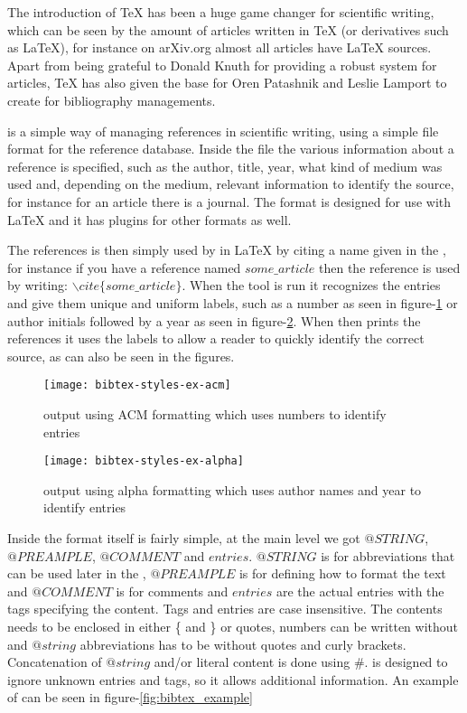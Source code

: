 The introduction of {\TeX} has been a huge game changer for scientific
writing, which can be seen by the amount of articles written in {\TeX}
(or derivatives such as {\LaTeX}), for instance on arXiv.org almost
all articles have {\LaTeX} sources.  Apart from being grateful to
Donald Knuth for providing a robust system for articles, {\TeX} has
also given the base for Oren Patashnik and Leslie Lamport to create
{\bibtex} for bibliography managements.

{\bibtex} is a simple way of managing references in scientific
writing, using a simple file format for the reference database.
Inside the file the various information about a reference is
specified, such as the author, title, year, what kind of medium was
used and, depending on the medium, relevant information to identify
the source, for instance for an article there is a journal.  The
{\bibtex} format is designed for use with {\LaTeX} and it has plugins
for other formats as well\cite{bibtex_resource}.

The references is then simply used by in {\LaTeX} by citing a name
given in the {\bibtex}, for instance if you have a reference named
$some\_article$ then the reference is used by writing:
${\backslash}cite\{some\_article\}$.  When the {\bibtex} tool is run
it recognizes the entries and give them unique and uniform labels,
such as a number as seen in figure-\ref{fig:bibtex_example_acm} or
author initials followed by a year as seen in
figure-\ref{fig:bibtex_example_alpha}.  When {\bibtex} then prints the
references it uses the labels to allow a reader to quickly identify
the correct source, as can also be seen in the figures.

\begin{figure}[ht]
  \centering
  \texttt{[image: bibtex-styles-ex-acm]}
  \caption{{\bibtex} output using ACM formatting which uses numbers to
    identify entries}
\label{fig:bibtex_example_acm}
\end{figure}

\begin{figure}[ht]
  \centering
  \texttt{[image: bibtex-styles-ex-alpha]}
  \caption{{\bibtex} output using alpha formatting which uses author
    names and year to identify entries}
\label{fig:bibtex_example_alpha}
\end{figure}

Inside {\bibtex} the format itself is fairly simple, at the main level
we got $@STRING$, $@PREAMPLE$, $@COMMENT$ and $entries$.  $@STRING$ is
for abbreviations that can be used later in the {\bibtex}, $@PREAMPLE$
is for defining how to format the text and $@COMMENT$ is for comments
and $entries$ are the actual entries with the tags specifying the
content.  Tags and entries are case insensitive. The contents needs to
be enclosed in either \{ and \} or quotes, numbers can be written
without and $@string$ abbreviations has to be without quotes and curly
brackets. Concatenation of $@string$ and/or literal content is done
using \#\cite{bibtex_resource}.  {\bibtex} is designed to ignore
unknown entries and tags, so it allows additional information.  An
example of {\bibtex} can be seen in figure-\ref{fig:bibtex_example}

